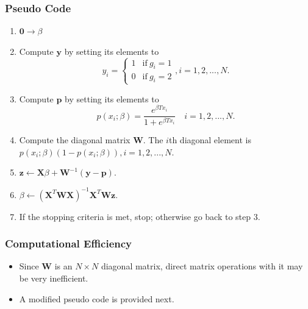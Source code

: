 \documentclass[12pt,notes,mathserif]{beamer}
\begin{document}
\begin{frame}[c]
	\frametitle{Pseudo Code}
	\begin{enumerate}
		\item $\bm{0}\to \beta$
		\item Compute $\bm{y}$ by setting its elements to
		      \begin{equation*}
			      y_i =\left\{
			      \begin{array}{ll}
				      1 & \text{if} ~g_i = 1 \\
				      0 & \text{if} ~g_i = 2
			      \end{array},
			      \right.
			      i = 1,2,...,N.
		      \end{equation*}

		\item Compute $\bm{p}$ by setting its elements to
		      \begin{equation*}
			      p(x_i;\beta)=\dfrac{e^{\beta Tx_i}}{1+e^{\beta Tx_i}}\quad
			      i=1,2,...,N.
		      \end{equation*}
		\item Compute the diagonal matrix $\mathbf{W}$. The $i$th diagonal element is $p(x_i ;\beta)(1 − p(x_i ;\beta)), i = 1,2,...,N$.
		\item $\bm{z} \leftarrow \mathbf{X}\beta+\mathbf{W}^{-1}(\bm{y}-\bm{p})$.
		\item $\beta \leftarrow (\mathbf{X}^T\mathbf{WX})^{-1}\mathbf{X}^T\mathbf{W}\bm{z}$.
		\item  If the stopping criteria is met, stop; otherwise go back to step 3.
	\end{enumerate}
\end{frame}

\begin{frame}[c]
	\frametitle{Computational Efficiency}
	\begin{itemize}
		\item  Since $\mathbf{W}$ is an $N \times N$ diagonal matrix, direct matrix operations with it may be very inefficient.
		\item A modified pseudo code is provided next.
	\end{itemize}
\end{frame}
\end{document}
